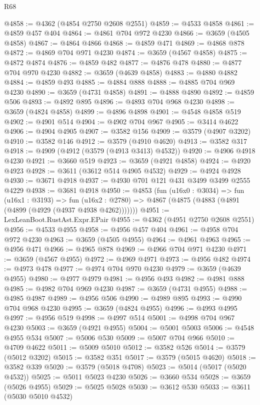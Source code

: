 \begin{lexlean}{R68}
\begin{coremodule}
@4858 := @4362 (@4854 @2750 @2608 @2551)
@4859 := @4533 @4858
@4861 := @4859 @457 @404
@4864 := @4861 @704 @972 @4230
@4866 := @3659 (@4505 @4858)
@4867 := @4864 @4866
@4868 := @4859 @471
@4869 := @4868 @878
@4872 := @4869 @704 @971 @4230
@4874 := @3659 (@4567 @4858)
@4875 := @4872 @4874
@4876 := @4859 @482
@4877 := @4876 @478
@4880 := @4877 @704 @970 @4230
@4882 := @3659 (@4639 @4858)
@4883 := @4880 @4882
@4884 := @4859 @493
@4885 := @4884 @888
@4888 := @4885 @704 @969 @4230
@4890 := @3659 (@4731 @4858)
@4891 := @4888 @4890
@4892 := @4859 @506
@4893 := @4892 @895
@4896 := @4893 @704 @968 @4230
@4898 := @3659 (@4824 @4858)
@4899 := @4896 @4898
@4901 := @4548 @4858 @519
@4902 := @4901 @514
@4904 := @4902 @704 @967
@4905 := @3414 @4622
@4906 := @4904 @4905
@4907 := @3582 @156
@4909 := @3579 (@4907 @3202)
@4910 := @3582 @146
@4912 := @3579 (@4910 @4620)
@4913 := @3582 @317
@4918 := @4909 (@4912 (@3579 (@4913 @3413) @4532))
@4920 := @4906 @4918 @4230
@4921 := @3660 @519
@4923 := @3659 (@4921 @4858)
@4924 := @4920 @4923
@4928 := @3611 (@3612 @514 @4905 @4532)
@4929 := @4924 @4928
@4930 := @3671 @4918
@4937 := @4930 @701 @121 @431 @3499 @3499 @2555 @4229
@4938 := @3681 @4918
@4950 := @4853
    (fun (u16x0 : @3034) =>
    fun (u16x1 : @3193) =>
    fun (u16x2 : @2780) => @4867 (@4875 (@4883 (@4891 (@4899 (@4929 (@4937 @4938 @4262)))))))
@4951 := LexLeanBoot.RustAst.Expr.EPair
@4955 := @4362 (@4951 @2750 @2608 @2551)
@4956 := @4533 @4955
@4958 := @4956 @457 @404
@4961 := @4958 @704 @972 @4230
@4963 := @3659 (@4505 @4955)
@4964 := @4961 @4963
@4965 := @4956 @471
@4966 := @4965 @878
@4969 := @4966 @704 @971 @4230
@4971 := @3659 (@4567 @4955)
@4972 := @4969 @4971
@4973 := @4956 @482
@4974 := @4973 @478
@4977 := @4974 @704 @970 @4230
@4979 := @3659 (@4639 @4955)
@4980 := @4977 @4979
@4981 := @4956 @493
@4982 := @4981 @888
@4985 := @4982 @704 @969 @4230
@4987 := @3659 (@4731 @4955)
@4988 := @4985 @4987
@4989 := @4956 @506
@4990 := @4989 @895
@4993 := @4990 @704 @968 @4230
@4995 := @3659 (@4824 @4955)
@4996 := @4993 @4995
@4997 := @4956 @519
@4998 := @4997 @514
@5001 := @4998 @704 @967 @4230
@5003 := @3659 (@4921 @4955)
@5004 := @5001 @5003
@5006 := @4548 @4955 @534
@5007 := @5006 @530
@5009 := @5007 @704 @966
@5010 := @4709 @4622
@5011 := @5009 @5010
@5012 := @3582 @526
@5014 := @3579 (@5012 @3202)
@5015 := @3582 @351
@5017 := @3579 (@5015 @4620)
@5018 := @3582 @339
@5020 := @3579 (@5018 @4708)
@5023 := @5014 (@5017 (@5020 @4532))
@5025 := @5011 @5023 @4230
@5026 := @3660 @534
@5028 := @3659 (@5026 @4955)
@5029 := @5025 @5028
@5030 := @3612 @530
@5033 := @3611 (@5030 @5010 @4532)

\end{coremodule}
\end{lexlean}
